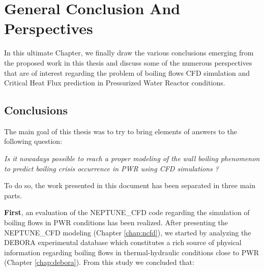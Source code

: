 
\chapter{General Conclusion And Perspectives} %

\label{ch:conclusion} %
\minitoc
In this ultimate Chapter, we finally draw the various conclusions emerging from the proposed work in this thesis and discuss some of the numerous perspectives that are of interest regarding the problem of boiling flows CFD simulation and Critical Heat Flux prediction in Pressurized Water Reactor conditions.


\section{Conclusions}

The main goal of this thesis was to try to bring elements of answers to the following question: 

\begin{center}
\textit{Is it nowadays possible to reach a proper modeling of the wall boiling phenomenon to predict boiling crisis occurrence in PWR using CFD simulations ?}
\end{center}

To do so, the work presented in this document has been separated in three main parts. 

\npar

\textbf{First}, an evaluation of the NEPTUNE\_CFD code regarding the simulation of boiling flows in PWR conditions has been realized. After presenting the NEPTUNE\_CFD modeling (Chapter \ref{chap:ncfd}), we started by analyzing the DEBORA experimental database which constitutes a rich source of physical information regarding boiling flows in thermal-hydraulic conditions close to PWR (Chapter \ref{chap:debora}). From this study we concluded that:

